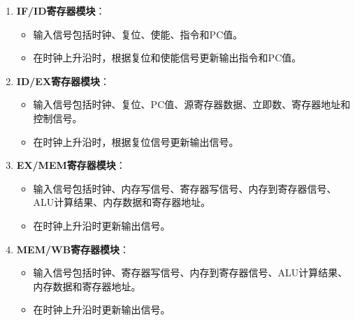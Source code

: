 \documentclass[12pt,hyperref,a4paper,UTF8]{ctexart}
\begin{document}
\begin{enumerate}
    \item \textbf{IF/ID寄存器模块}：
    \begin{itemize}
        \item 输入信号包括时钟、复位、使能、指令和PC值。
        \item 在时钟上升沿时，根据复位和使能信号更新输出指令和PC值。
    \end{itemize}

    \item \textbf{ID/EX寄存器模块}：
    \begin{itemize}
        \item 输入信号包括时钟、复位、PC值、源寄存器数据、立即数、寄存器地址和控制信号。
        \item 在时钟上升沿时，根据复位信号更新输出信号。
    \end{itemize}

    \item \textbf{EX/MEM寄存器模块}：
    \begin{itemize}
        \item 输入信号包括时钟、内存写信号、寄存器写信号、内存到寄存器信号、ALU计算结果、内存数据和寄存器地址。
        \item 在时钟上升沿时更新输出信号。
    \end{itemize}

    \item \textbf{MEM/WB寄存器模块}：
    \begin{itemize}
        \item 输入信号包括时钟、寄存器写信号、内存到寄存器信号、ALU计算结果、内存数据和寄存器地址。
        \item 在时钟上升沿时更新输出信号。
    \end{itemize}
\end{enumerate}
\end{document}
